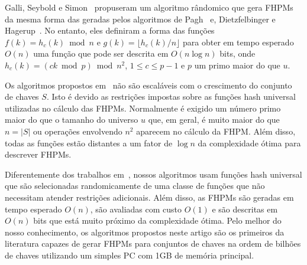 Galli, Seybold e Simon~\cite{gss01} propuseram um algoritmo r\^andomico
que gera FHPMs da mesma forma das geradas pelos algoritmos de Pagh~\cite{p99}
e, Dietzfelbinger e Hagerup~\cite{dh01}. No entanto, eles definiram a forma das 
fun\c{c}\~oes $f(k) = h_c(k) \bmod n$ e $g(k) = \lfloor h_c(k)/n \rfloor$ para obter em tempo esperado $O(n)$ uma fun\c{c}\~ao que pode ser descrita em $O(n\log n)$ bits, onde
$h_c(k) = (ck \bmod p) \bmod n^2$, $1 \leq c \leq  p-1$ e $p$ um primo maior do que $u$.

Os algoritmos propostos em~\cite{p99,dh01,gss01} n\~ao s\~ao escal\'aveis com o crescimento do
conjunto de chaves $S$. Isto \'e devido as restri\c{c}\~oes impostas sobre as fun\c{c}\~oes
hash universal utilizadas no c\'alculo das FHPMs. Normalmente \'e exigido um 
n\'umero primo maior do que o tamanho do universo $u$ que, em geral, \'e muito maior
do que $n=|S|$ ou opera\c{c}\~oes envolvendo $n^2$ aparecem no c\'alculo da FHPM.
Al\'em disso, todas as fun\c{c}\~oes est\~ao distantes a um fator de $\log n$ da complexidade 
\'otima para descrever FHPMs.
  
Diferentemente dos trabalhos em~\cite{p99,dh01,gss01}, nossos algoritmos usam  
fun\c{c}\~oes hash universal que s\~ao selecionadas randomicamente de uma classe 
de fun\c{c}\~oes que n\~ao necessitam atender restri\c{c}\~oes adicionais.
Al\'em disso, as FHPMs s\~ao geradas em tempo esperado $O(n)$, s\~ao avaliadas 
com custo $O(1)$ e s\~ao descritas em $O(n)$ bits que est\'a muito pr\'oximo da
complexidade \'otima. 
Pelo melhor do nosso conhecimento, os algoritmos propostos neste artigo s\~ao
os primeiros da literatura capazes de gerar FHPMs para conjuntos de chaves na
ordem de bilh\~oes de chaves utilizando um simples PC com 1GB de mem\'oria principal.